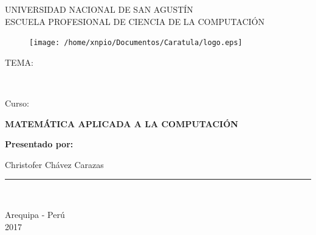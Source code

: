 \documentclass[a4paper,12pt]{article}
\begin{document}
\begin{titlepage}

\begin{center}
\vspace*{-1in}

\begin{large}
UNIVERSIDAD NACIONAL DE SAN AGUSTÍN\\
\vspace*{0.15in}
ESCUELA PROFESIONAL DE CIENCIA DE LA COMPUTACIÓN\\
\end{large}
\begin{figure}[htb]
\centering
\texttt{[image: /home/xnpio/Documentos/Caratula/logo.eps]}
\end{figure}
\vspace*{0.15in}
\begin{large}
TEMA:\\
\end{large}
\vspace*{0.2in}
\begin{Large}
\textbf{} \\
\end{Large}
\vspace{8mm}

\begin{large}
Curso:\\
\end{large}
\vspace*{0.2in}
\begin{Large}
\textbf{MATEMÁTICA APLICADA A LA COMPUTACIÓN} \\
\end{Large}

\vspace{8mm}

\begin{large}
\textbf{Presentado por:}\\

\begin{flushleft}

\hspace{7cm} Christofer Chávez Carazas \\

\end{flushleft}
\end{large}
\vspace{4cm}
\rule{80mm}{0.1mm}\\
\vspace*{0.1in}

\begin{large}
Arequipa - Perú \\
2017 \\
\end{large}
\end{center}
\end{titlepage}
\end{document}
